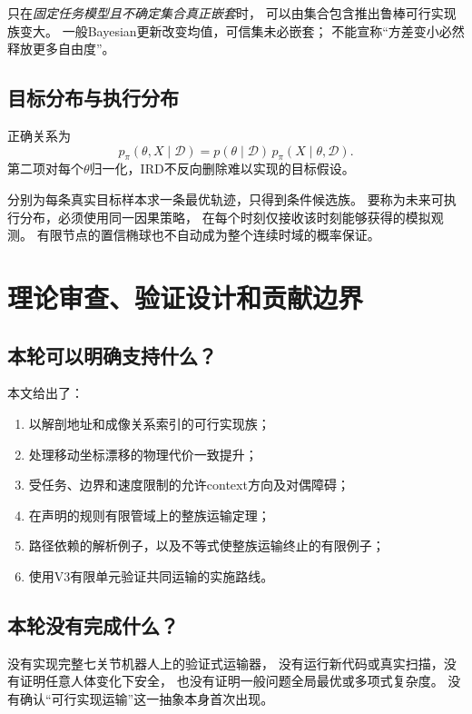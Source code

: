 \documentclass[UTF8,11pt,a4paper,fontset=fandol]{ctexart}
\numberwithin{equation}{section}
\theoremstyle{definition}
\begin{document}
只在\emph{固定任务模型且不确定集合真正嵌套}时，
可以由集合包含推出鲁棒可行实现族变大。
一般Bayesian更新改变均值，可信集未必嵌套；
不能宣称“方差变小必然释放更多自由度”。

\subsection{目标分布与执行分布}

正确关系为
\begin{equation}
 p_\pi(\theta,X\mid\mathcal D)
 =
 p(\theta\mid\mathcal D)\,
 p_\pi(X\mid\theta,\mathcal D).
\end{equation}
第二项对每个$\theta$归一化，IRD不反向删除难以实现的目标假设。

分别为每条真实目标样本求一条最优轨迹，只得到条件候选族。
要称为未来可执行分布，必须使用同一因果策略，
在每个时刻仅接收该时刻能够获得的模拟观测。
有限节点的置信椭球也不自动成为整个连续时域的概率保证。

\section{理论审查、验证设计和贡献边界}

\subsection{本轮可以明确支持什么？}

本文给出了：
\begin{enumerate}
\item 以解剖地址和成像关系索引的可行实现族；
\item 处理移动坐标漂移的物理代价一致提升；
\item 受任务、边界和速度限制的允许context方向及对偶障碍；
\item 在声明的规则有限管域上的整族运输定理；
\item 路径依赖的解析例子，以及不等式使整族运输终止的有限例子；
\item 使用V3有限单元验证共同运输的实施路线。
\end{enumerate}

\subsection{本轮没有完成什么？}

没有实现完整七关节机器人上的验证式运输器，
没有运行新代码或真实扫描，没有证明任意人体变化下安全，
也没有证明一般问题全局最优或多项式复杂度。
没有确认“可行实现运输”这一抽象本身首次出现。
\end{document}
